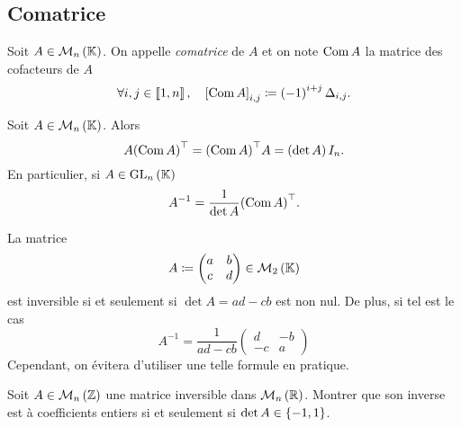 \documentclass{magnolia}
\begin{document}
\subsection{Comatrice}
\begin{definition}
Soit $A\in\mathcal{M}_{n}\left(\mathbb{K}\right)$. On appelle \emph{comatrice} de $A$ et on note $\mathop{\rm Com} A$ la
matrice des cofacteurs de $A$
\[\forall i,j\in\left\llbracket 1,n\right\rrbracket ,\quad \left[\mathop{\rm Com} A\right]_{i,j}\coloneqq
  \left(-1\right)^{i+j}\Delta_{i,j}.\]
\end{definition}

\begin{proposition}
Soit $A\in\mathcal{M}_{n}\left(\mathbb{K}\right)$. Alors
\[A{\left(\mathop{\rm Com} A\right)}^{\top}={\left(\mathop{\rm Com} A\right)}^{\top}A=\left(\mathop{\rm det} A\right)I_n.\]
En particulier, si $A\in{\rm GL}_{n}\left(\mathbb{K}\right)$
\[A^{-1}=\frac{1}{\mathop{\rm det} A}{\left(\mathop{\rm Com} A\right)}^{\top}.\]
\end{proposition}


\begin{remarqueUnique}
\remarque La matrice
  \[A\coloneqq\begin{pmatrix}a&b\\c&d\end{pmatrix}\in\mathcal{M}_{2}\left(\mathbb{K}\right)\]
  est inversible si et seulement si $\det A=ad-cb$ est non nul. De plus, si tel est le cas
  \[A^{-1}=\frac{1}{ad-cb}\begin{pmatrix}d&-b\\-c&a\end{pmatrix}\]
  Cependant, on évitera d'utiliser une telle formule en pratique.
\end{remarqueUnique}

\begin{exoUnique}
\exo Soit $A\in\mathcal{M}_{n}\left(\mathbb{Z}\right)$ une matrice inversible dans $\mathcal{M}_{n}\left(\mathbb{R}\right)$.
  Montrer que son inverse est à coefficients entiers si et seulement si
  $\mathop{\rm det} A\in\left\{-1,1\right\}$.
\end{exoUnique}


\end{document}
